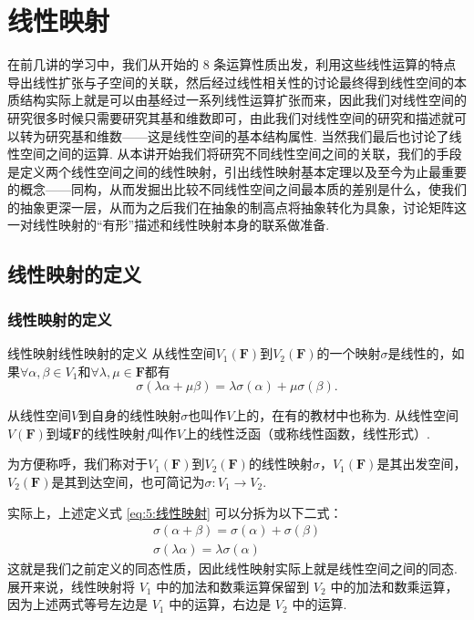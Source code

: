 \chapter{线性映射}

在前几讲的学习中，我们从开始的 8 条运算性质出发，利用这些线性运算的特点导出线性扩张与子空间的关联，然后经过线性相关性的讨论最终得到线性空间的本质结构实际上就是可以由基经过一系列线性运算扩张而来，因此我们对线性空间的研究很多时候只需要研究其基和维数即可，由此我们对线性空间的研究和描述就可以转为研究基和维数——这是线性空间的基本结构属性. 当然我们最后也讨论了线性空间之间的运算. 从本讲开始我们将研究不同线性空间之间的关联，我们的手段是定义两个线性空间之间的线性映射，引出线性映射基本定理以及至今为止最重要的概念——同构，从而发掘出比较不同线性空间之间最本质的差别是什么，使我们的抽象更深一层，从而为之后我们在抽象的制高点将抽象转化为具象，讨论矩阵这一对线性映射的``有形''描述和线性映射本身的联系做准备.

\section{线性映射的定义}

\subsection{线性映射的定义}

\begin{definition}{线性映射}{线性映射的定义} 
    从线性空间$V_1(\mathbf{F})$到$V_2(\mathbf{F})$的一个映射$\sigma$是线性的，如果$\forall \alpha,\beta \in V_1$和$\forall \lambda,\mu \in \mathbf{F}$都有
    \begin{equation}\label{eq:5:线性映射}
        \sigma(\lambda\alpha+\mu\beta)=\lambda\sigma(\alpha)+\mu\sigma(\beta).
    \end{equation}

    从线性空间$V$到自身的线性映射$\sigma$也叫作$V$上的，在有的教材中也称为. 从线性空间$V(\mathbf{F})$到域$\mathbf{F}$的线性映射$f$叫作$V$上的线性泛函（或称线性函数，线性形式）.

    为方便称呼，我们称对于$V_1(\mathbf{F})$到$V_2(\mathbf{F})$的线性映射$\sigma$，$V_1(\mathbf{F})$是其出发空间，$V_2(\mathbf{F})$是其到达空间，也可简记为$\sigma: V_1\to V_2$.
\end{definition}
实际上，上述定义式 \ref*{eq:5:线性映射} 可以分拆为以下二式：
\begin{gather}
    \tag{加性} \sigma(\alpha+\beta)=\sigma(\alpha)+\sigma(\beta) \\
    \tag{齐次性} \sigma(\lambda\alpha)=\lambda\sigma(\alpha)
\end{gather}
这就是我们之前定义的同态性质，因此线性映射实际上就是线性空间之间的同态. 展开来说，线性映射将 $V_1$ 中的加法和数乘运算保留到 $V_2$ 中的加法和数乘运算，因为上述两式等号左边是 $V_1$ 中的运算，右边是 $V_2$ 中的运算.

